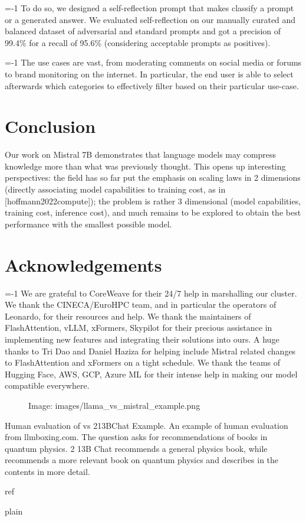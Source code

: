 \documentclass[11pt,a4paper]{article}
\begin{document}
=-1 To do so, we designed a self-reflection prompt that makes classify a prompt or a generated answer. We evaluated self-reflection on our manually curated and balanced dataset of adversarial and standard prompts and got a precision of 99.4\% for a recall of 95.6\% (considering acceptable prompts as positives).

=-1 The use cases are vast, from moderating comments on social media or forums to brand monitoring on the internet. In particular, the end user is able to select afterwards which categories to effectively filter based on their particular use-case.

\section{Conclusion}

Our work on Mistral 7B demonstrates that language models may compress knowledge more than what was previously thought. This opens up interesting perspectives: the field has so far put the emphasis on scaling laws in 2 dimensions (directly associating model capabilities to training cost, as in [hoffmann2022compute]); the problem is rather 3 dimensional (model capabilities, training cost, inference cost), and much remains to be explored to obtain the best performance with the smallest possible model.

\section{Acknowledgements}

=-1 We are grateful to CoreWeave for their 24/7 help in marshalling our cluster. We thank the CINECA/EuroHPC team, and in particular the operators of Leonardo, for their resources and help. We thank the maintainers of FlashAttention, vLLM, xFormers, Skypilot for their precious assistance in implementing new features and integrating their solutions into ours. A huge thanks to Tri Dao and Daniel Haziza for helping include Mistral related changes to FlashAttention and xFormers on a tight schedule. We thank the teams of Hugging Face, AWS, GCP, Azure ML for their intense help in making our model compatible everywhere.

\begin{figure}[h]
\caption{Image: images/llama\_vs\_mistral\_example.png}
\end{figure}

Human evaluation of vs 213BChat Example. An example of human evaluation from llmboxing.com. The question asks for recommendations of books in quantum physics. 2 13B Chat recommends a general physics book, while recommends a more relevant book on quantum physics and describes in the contents in more detail.

ref

plain
\end{document}
